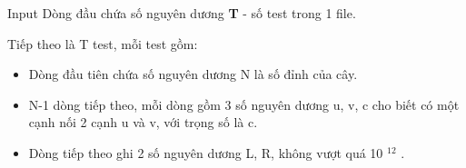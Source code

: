 Input
Dòng đầu chứa số nguyên dương   \textbf{    T   }   - số test trong 1 file.  

   Tiếp theo là T test, mỗi test gồm:  
\begin{itemize}
	\item     Dòng đầu tiên chứa số nguyên dương N là số đỉnh của cây.   
	\item     N-1 dòng tiếp theo, mỗi dòng gồm 3 số nguyên dương u, v, c cho biết có một cạnh nối 2 cạnh u và v, với trọng số là c.   
	\item     Dòng tiếp theo ghi 2 số nguyên dương L, R, không vượt quá 10    $^     12    $    .   
\end{itemize}